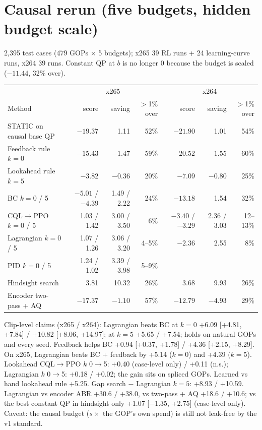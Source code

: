 \documentclass[10pt,a4paper]{article}
\begin{document}
\section{Causal rerun (five budgets, hidden budget scale)}
2,395 test cases (479 GOPs $\times$ 5 budgets); x265 39 RL runs + 24 learning-curve runs, x264 39 runs. Constant QP
at $b$ is no longer 0 because the budget is scaled ($-11.44$, 32\% over).
\begin{center}\small
\begin{tabular}{lrrr|rrr}
\toprule
& \multicolumn{3}{c|}{x265} & \multicolumn{3}{c}{x264} \\
Method & score & saving & $>$1\% over & score & saving & $>$1\% over \\\midrule
STATIC on causal base QP & $-19.37$ & 1.11 & 52\% & $-21.90$ & 1.01 & 54\% \\
Feedback rule $k=0$ & $-15.43$ & $-1.47$ & 59\% & $-20.52$ & $-1.55$ & 60\% \\
Lookahead rule $k=5$ & $-3.82$ & $-0.36$ & 20\% & $-7.09$ & $-0.80$ & 25\% \\
BC $k=0$ / 5 & $-5.01$ / $-4.39$ & 1.49 / 2.22 & 24\% & $-13.18$ & 1.54 & 32\% \\
CQL$\to$PPO $k=0$ / 5 & 1.03 / 1.42 & 3.00 / 3.50 & 6\% & $-3.40$ / $-3.29$ & 2.36 / 3.03 & 12--13\% \\
Lagrangian $k=0$ / 5 & 1.07 / 1.26 & 3.06 / 3.20 & 4--5\% & $-2.36$ & 2.55 & 8\% \\
PID $k=0$ / 5 & 1.24 / 1.02 & 3.39 / 3.98 & 5--9\% & & & \\
Hindsight search & 3.81 & 10.32 & 26\% & 3.68 & 9.93 & 26\% \\
Encoder two-pass + AQ & $-17.37$ & $-1.10$ & 57\% & $-12.79$ & $-4.93$ & 29\% \\
\bottomrule
\end{tabular}
\end{center}
Clip-level claims (x265 / x264): Lagrangian beats BC at $k=0$ +6.09 [+4.81, +7.84] / +10.82 [+8.06, +14.97]; at $k=5$
+5.65 / +7.54; holds on natural GOPs and every seed. Feedback helps BC +0.94 [+0.37, +1.78] / +4.36 [+2.15, +8.29].
On x265, Lagrangian beats BC + feedback by +5.14 ($k=0$) and +4.39 ($k=5$). Lookahead CQL$\to$PPO $k$ 0$\to$5: +0.40 (case-level only) / +0.11
(n.s.); Lagrangian $k$ 0$\to$5: +0.18 / +0.02; the gain sits on spliced GOPs. Learned vs hand lookahead rule +5.25. Gap
search $-$ Lagrangian $k=5$: +8.93 / +10.59. Lagrangian vs encoder ABR +30.6 / +38.0, vs two-pass + AQ +18.6 / +10.6;
vs the best constant QP in hindsight only +1.07 [$-1.35$, +2.75] (case-level only). Caveat: the causal budget
($s\times$ the GOP's own spend) is still not leak-free by the v1 standard.
\end{document}

